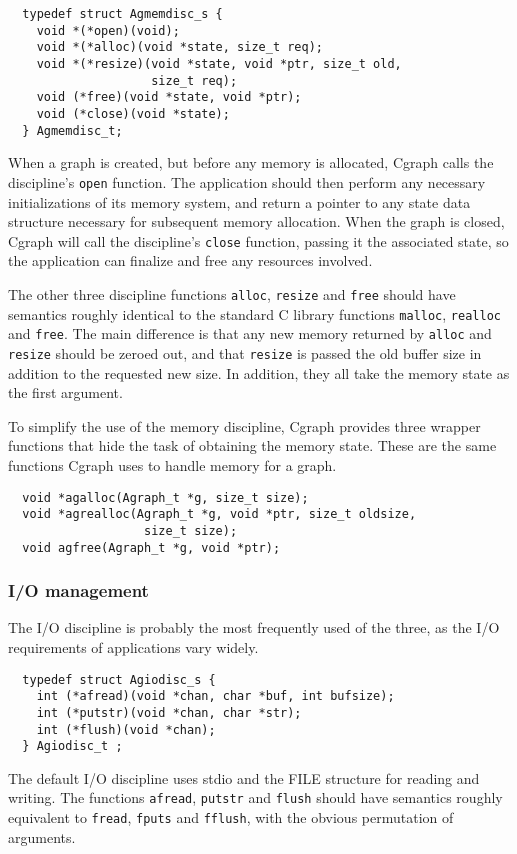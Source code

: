 \documentclass[11pt,letterpaper]{article}
\begin{document}

\begin{verbatim}
  typedef struct Agmemdisc_s {
    void *(*open)(void);
    void *(*alloc)(void *state, size_t req);
    void *(*resize)(void *state, void *ptr, size_t old, 
                    size_t req);
    void (*free)(void *state, void *ptr);
    void (*close)(void *state);
  } Agmemdisc_t;
\end{verbatim}

When a graph is created, but before any memory is allocated, Cgraph calls the 
discipline's \verb"open" function. The application should then perform any necessary
initializations of its memory system, and return a pointer to any state data structure
necessary for subsequent memory allocation. When the graph is closed, Cgraph will 
call the discipline's \verb"close" function, passing it the associated state, so the application
can finalize and free any resources involved.

The other three discipline functions \verb"alloc", \verb"resize" and \verb"free" should have semantics
roughly identical to the standard C library functions \verb"malloc", \verb"realloc" and \verb"free".
The main difference is that any new memory returned by \verb"alloc" and \verb"resize" should be zeroed out,
and that \verb"resize" is passed the old buffer size in addition to the requested new size. In addition,
they all take the memory state as the first argument.

To simplify the use of the memory discipline, Cgraph provides three wrapper functions that hide the
task of obtaining the memory state. These are the same functions Cgraph uses to handle memory for a graph.
\begin{verbatim}
  void *agalloc(Agraph_t *g, size_t size);
  void *agrealloc(Agraph_t *g, void *ptr, size_t oldsize, 
                   size_t size);
  void agfree(Agraph_t *g, void *ptr);
\end{verbatim}

\subsubsection{I/O management}
The I/O discipline is probably the most frequently used of the three, as the I/O requirements of
applications vary widely. 
\begin{verbatim}
  typedef struct Agiodisc_s {
    int (*afread)(void *chan, char *buf, int bufsize);
    int (*putstr)(void *chan, char *str);
    int (*flush)(void *chan);
  } Agiodisc_t ;
\end{verbatim}
The default I/O discipline uses stdio and the FILE structure for reading and writing. The functions
\verb"afread", \verb"putstr" and \verb"flush" should have semantics roughly equivalent to 
\verb"fread", \verb"fputs" and \verb"fflush", with the obvious permutation of arguments.
\end{document}
